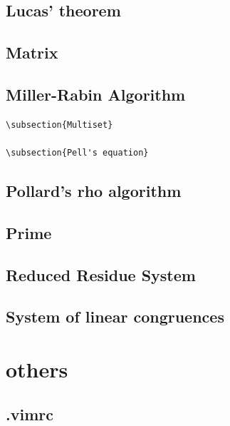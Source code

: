 \documentclass[a4paper,5pt,titlepage]{article}
\begin{document}
\subsection{Lucas' theorem}

\subsection{Matrix}

\subsection{Miller-Rabin Algorithm}



\begin{verbatim}
\subsection{Multiset}

\subsection{Pell's equation}

\end{verbatim}

\subsection{Pollard's rho algorithm}

\subsection{Prime}

\subsection{Reduced Residue System}

\subsection{System of linear congruences}

\section{others}
\subsection{.vimrc}

\end{document}
